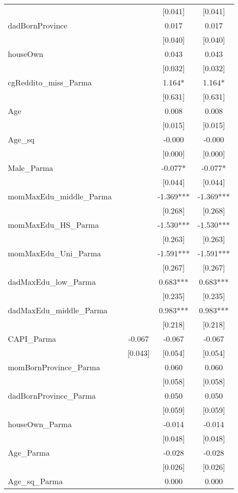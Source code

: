 \documentclass[]{article}
\begin{document}
\begin{tabular}{lcccc}
 &  &  & [0.041] & [0.041] \\
dadBornProvince &  &  & 0.017 & 0.017 \\
 &  &  & [0.040] & [0.040] \\
houseOwn &  &  & 0.043 & 0.043 \\
 &  &  & [0.032] & [0.032] \\
cgReddito\_miss\_Parma &  &  & 1.164* & 1.164* \\
 &  &  & [0.631] & [0.631] \\
Age &  &  & 0.008 & 0.008 \\
 &  &  & [0.015] & [0.015] \\
Age\_sq &  &  & -0.000 & -0.000 \\
 &  &  & [0.000] & [0.000] \\
Male\_Parma &  &  & -0.077* & -0.077* \\
 &  &  & [0.044] & [0.044] \\
momMaxEdu\_middle\_Parma &  &  & -1.369*** & -1.369*** \\
 &  &  & [0.268] & [0.268] \\
momMaxEdu\_HS\_Parma &  &  & -1.530*** & -1.530*** \\
 &  &  & [0.263] & [0.263] \\
momMaxEdu\_Uni\_Parma &  &  & -1.591*** & -1.591*** \\
 &  &  & [0.267] & [0.267] \\
dadMaxEdu\_low\_Parma &  &  & 0.683*** & 0.683*** \\
 &  &  & [0.235] & [0.235] \\
dadMaxEdu\_middle\_Parma &  &  & 0.983*** & 0.983*** \\
 &  &  & [0.218] & [0.218] \\
CAPI\_Parma &  & -0.067 & -0.067 & -0.067 \\
 &  & [0.043] & [0.054] & [0.054] \\
momBornProvince\_Parma &  &  & 0.060 & 0.060 \\
 &  &  & [0.058] & [0.058] \\
dadBornProvince\_Parma &  &  & 0.050 & 0.050 \\
 &  &  & [0.059] & [0.059] \\
houseOwn\_Parma &  &  & -0.014 & -0.014 \\
 &  &  & [0.048] & [0.048] \\
Age\_Parma &  &  & -0.028 & -0.028 \\
 &  &  & [0.026] & [0.026] \\
Age\_sq\_Parma &  &  & 0.000 & 0.000 \\

\end{tabular}
\end{document}
